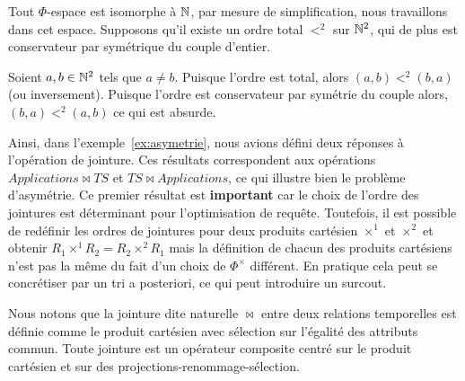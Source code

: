 \begin{demo}
    Tout $\Phi$-espace est isomorphe à $\mathbb{N}$, par mesure de simplification, nous travaillons dans cet espace. Supposons qu'il existe un ordre total $<^2$ sur $\mathbb{N}^2$, qui de plus est conservateur par symétrique du couple d'entier.

    Soient $a,b\in \mathbb{N}^2$ tels que $a \neq b$. Puisque l'ordre est total, alors $(a,b) <^2 (b,a)$ (ou inversement). Puisque l'ordre est conservateur par symétrie du couple alors, $(b,a) <^2 (a,b)$ ce qui est absurde.
\end{demo}

Ainsi, dans l'exemple~\ref{ex:asymetrie}, nous avions défini deux réponses à l'opération de jointure. Ces résultats correspondent aux opérations $Applications\Join TS$ et $TS \Join Applications$, ce qui illustre bien le problème d'asymétrie. Ce premier résultat est \textbf{important} car le choix de l'ordre des jointures est déterminant pour l'optimisation de requête. Toutefois, il est possible de redéfinir les ordres de jointures pour deux produits cartésien $\times^1$ et $\times^2$ et obtenir $R_1 \times^1 R_2 = R_2 \times^2 R_1$ mais la définition de chacun des produits cartésiens n'est pas la même du fait d'un choix de $\Phi^\times$ différent. En pratique cela peut se concrétiser par un tri a posteriori, ce qui peut introduire un surcout.

Nous notons que la jointure dite naturelle $\Join$ entre deux relations temporelles est définie comme le produit cartésien avec sélection sur l'égalité des attributs commun. Toute jointure est un opérateur composite centré sur le produit cartésien et sur des projections-renommage-sélection.

